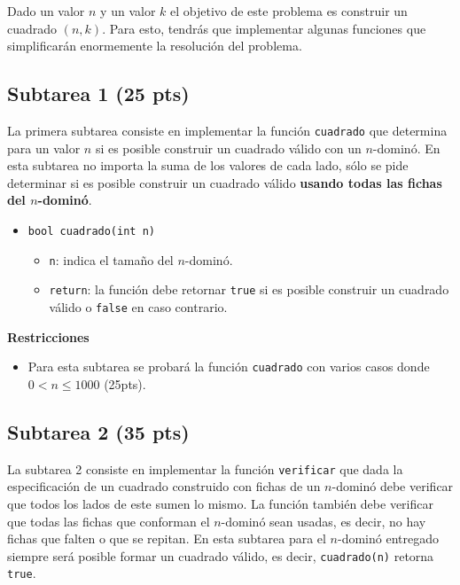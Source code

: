 \documentclass{oci}
\begin{document}
Dado un valor $n$ y un valor $k$ el objetivo de este problema es construir un cuadrado $(n,k)$.
Para esto, tendrás que implementar algunas funciones que simplificarán enormemente la resolución del problema.



\subsection*{Subtarea 1 (25 pts)}
La primera subtarea consiste en implementar la función \verb+cuadrado+ que determina para un valor $n$ si es posible construir un cuadrado válido con un $n$-dominó.
En esta subtarea no importa la suma de los valores de cada lado, sólo se pide determinar si es posible construir un cuadrado válido {\bf usando todas las fichas del $n$-dominó}.

\begin{itemize}
 \item \verb+bool cuadrado(int n)+
 \begin{itemize}
  \item \verb+n+: indica el tamaño del $n$-dominó.
  \item \verb+return+: la función debe retornar \verb+true+ si es posible construir un cuadrado válido o \verb+false+ en caso contrario.
 \end{itemize}
\end{itemize}
\vspace{-1em}

{\bf Restricciones}
\vspace{-1.2em}
\begin{itemize}
\item Para esta subtarea se probará la función \verb+cuadrado+ con varios casos donde $0< n\leq 1000$ (25pts).
\end{itemize}

\subsection*{Subtarea 2 (35 pts)}
La subtarea 2 consiste en implementar la función \verb+verificar+ que dada la especificación de un cuadrado construido con fichas de un $n$-dominó debe verificar que todos los lados de este sumen lo mismo.
La función también debe verificar que todas las fichas que conforman el $n$-dominó sean usadas, es decir, no hay fichas que falten o que se repitan.
En esta subtarea para el $n$-dominó entregado siempre será posible formar un cuadrado válido, es decir, \verb+cuadrado(n)+ retorna \verb+true+.
\end{document}
